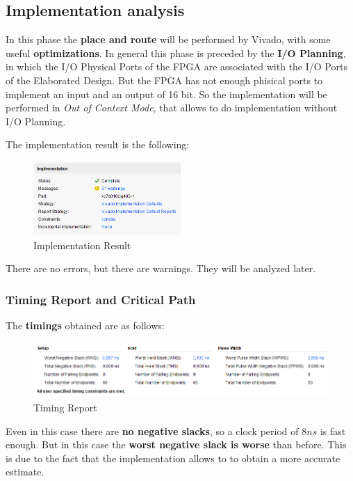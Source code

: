 \subsection{Implementation analysis}

In this phase the \textbf{place and route} will be performed by Vivado, with some useful \textbf{optimizations}. In general this phase is preceded by the \textbf{I/O Planning}, in which the I/O Physical Ports of the FPGA are associated with the I/O Ports of the Elaborated Design. But the FPGA has not enough phisical ports to implement an input and an output of 16 bit. So the implementation will be performed in \textit{Out of Context Mode}, that allows to do implementation without I/O Planning. 

The implementation result is the following:

\begin{figure}[H]
    \centering
    \includegraphics[width=0.5\textwidth]{img/Chapter5/ImplementationResult.png}
    \caption{Implementation Result}
    \label{fig:IR}
\end{figure}

There are no errors, but there are warnings. They will be analyzed later.

\subsubsection{Timing Report and Critical Path}

The \textbf{timings} obtained are as follows:

\begin{figure}[H]
    \centering
    \includegraphics[width=1\textwidth]{img/Chapter5/ImplementationTiming.png}
    \caption{Timing Report}
    \label{fig:ITR}
\end{figure}

Even in this case there are \textbf{no negative slacks}, so a clock period of $8ns$ is fast enough. But in this case the \textbf{worst negative slack is worse} than before. This is due to the fact that the implementation allows to to obtain a more accurate estimate.

